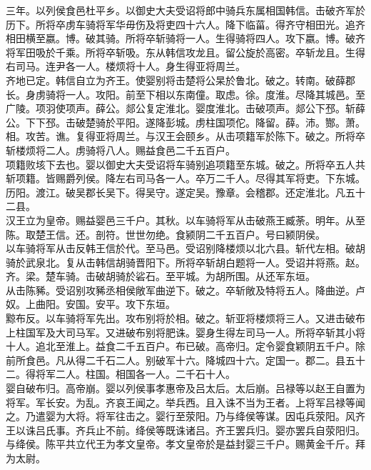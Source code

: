 \documentclass{zhvt-classic}
\begin{document}
\hspace*{2em}三年。以列侯食邑杜平乡。以御史大夫受诏将郎中骑兵东属相国韩信。击破齐军於历下。所将卒虏车骑将军华毋伤及将吏四十六人。降下临菑。得齐守相田光。追齐相田横至嬴。博。破其骑。所将卒斩骑将一人。生得骑将四人。攻下嬴。博。破齐将军田吸於千乘。所将卒斩吸。东从韩信攻龙且。留公旋於高密。卒斩龙且。生得右司马。连尹各一人。楼烦将十人。身生得亚将周兰。\\
\hspace*{2em}齐地已定。韩信自立为齐王。使婴别将击楚将公杲於鲁北。破之。转南。破薛郡长。身虏骑将一人。攻阳。前至下相以东南僮。取虑。徐。度淮。尽降其城邑。至广陵。项羽使项声。薛公。郯公复定淮北。婴度淮北。击破项声。郯公下邳。斩薛公。下下邳。击破楚骑於平阳。遂降彭城。虏柱国项佗。降留。薛。沛。酂。萧。相。攻苦。谯。复得亚将周兰。与汉王会颐乡。从击项籍军於陈下。破之。所将卒斩楼烦将二人。虏骑将八人。赐益食邑二千五百户。\\
\hspace*{2em}项籍败垓下去也。婴以御史大夫受诏将车骑别追项籍至东城。破之。所将卒五人共斩项籍。皆赐爵列侯。降左右司马各一人。卒万二千人。尽得其军将吏。下东城。历阳。渡江。破吴郡长吴下。得吴守。遂定吴。豫章。会稽郡。还定淮北。凡五十二县。\\
\hspace*{2em}汉王立为皇帝。赐益婴邑三千户。其秋。以车骑将军从击破燕王臧荼。明年。从至陈。取楚王信。还。剖符。世世勿绝。食颍阴二千五百户。号曰颍阴侯。\\
\hspace*{2em}以车骑将军从击反韩王信於代。至马邑。受诏别降楼烦以北六县。斩代左相。破胡骑於武泉北。复从击韩信胡骑晋阳下。所将卒斩胡白题将一人。受诏并将燕。赵。齐。梁。楚车骑。击破胡骑於硰石。至平城。为胡所围。从还军东垣。\\
\hspace*{2em}从击陈豨。受诏别攻豨丞相侯敞军曲逆下。破之。卒斩敞及特将五人。降曲逆。卢奴。上曲阳。安国。安平。攻下东垣。\\
\hspace*{2em}黥布反。以车骑将军先出。攻布别将於相。破之。斩亚将楼烦将三人。又进击破布上柱国军及大司马军。又进破布别将肥诛。婴身生得左司马一人。所将卒斩其小将十人。追北至淮上。益食二千五百户。布已破。高帝归。定令婴食颖阴五千户。除前所食邑。凡从得二千石二人。别破军十六。降城四十六。定国一。郡二。县五十二。得将军二人。柱国。相国各一人。二千石十人。\\
\hspace*{2em}婴自破布归。高帝崩。婴以列侯事孝惠帝及吕太后。太后崩。吕禄等以赵王自置为将军。军长安。为乱。齐哀王闻之。举兵西。且入诛不当为王者。上将军吕禄等闻之。乃遣婴为大将。将军往击之。婴行至荥阳。乃与绛侯等谋。因屯兵荥阳。风齐王以诛吕氏事。齐兵止不前。绛侯等既诛诸吕。齐王罢兵归。婴亦罢兵自荥阳归。与绛侯。陈平共立代王为孝文皇帝。孝文皇帝於是益封婴三千户。赐黄金千斤。拜为太尉。\\
\end{document}
